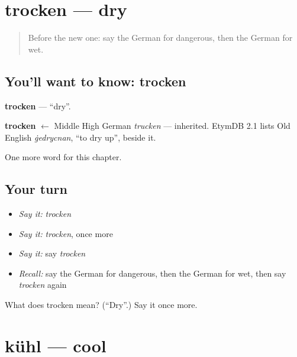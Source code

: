 \section[trocken]{trocken — dry}

\label{lesson:GE-C135-trocken}



\begin{quote}
Before the new one: say the German for dangerous, then the German for wet.
\end{quote}

\subsection*{You'll want to know: trocken}
\textbf{trocken} — \textquotedblleft{}dry\textquotedblright{}.

\begin{cousinweb}
\textbf{trocken} $\leftarrow$ Middle High German \emph{trucken} — inherited. EtymDB 2.1 lists Old English \emph{ġedrycnan}, \textquotedblleft{}to dry up\textquotedblright{}, beside it.
\end{cousinweb}

\begin{grammarlens}[title={What you've built}]
One more word for this chapter.
\end{grammarlens}

\subsection*{Your turn}
\begin{itemize}
\raggedright
  \item \emph{Say it:} \emph{trocken}
  \item \emph{Say it:} \emph{trocken}, once more
  \item \emph{Say it:} say \emph{trocken}
  \item \emph{Recall:} say the German for dangerous, then the German for wet, then say \emph{trocken} again
\end{itemize}

\begin{tcolorbox}[breakable,colback=teal!4,colframe=teal!35!black,title={Before you move on}]
What does trocken mean? (\textquotedblleft{}Dry\textquotedblright{}.) Say it once more.
\end{tcolorbox}
\section[kühl]{kühl — cool}

